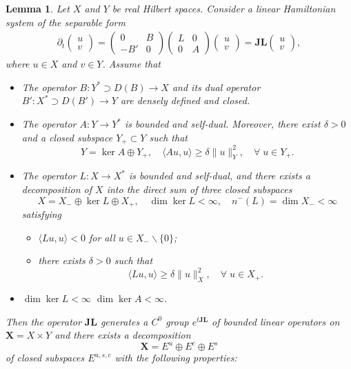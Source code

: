 \documentclass[1 [leqno, 11pt]{amsart}
\numberwithin{equation}{section}
\newtheorem{lemma}[Theorem]{Lemma}
\begin{document}
\begin{CJK*}{GBK}{song}
\begin{lemma}  \label{indice-theorem-sep}
Let $X$ and $Y$ be real Hilbert spaces. Consider a linear Hamiltonian system of the separable form
\begin{align}\label{sep-hamil}
\partial_t \left( \begin{array}{c} u \\ v \end{array} \right) = \left( \begin{array}{cc} 0 & B \\ -B' & 0 \end{array} \right)\left( \begin{array}{cc} L & 0 \\ 0 & A \end{array} \right) \left( \begin{array}{c} u \\ v \end{array} \right) = \mathbf{J}  \mathbf{L} \left( \begin{array}{c} u \\ v \end{array} \right),
\end{align}
where $u \in X$ and $v \in Y$.
Assume that
\begin{itemize}
\item[{\textbf{(G1)}}] The operator $B: Y^* \supset D(B) \rightarrow X$ and its dual operator $B': X^* \supset D(B') \rightarrow Y$ are densely defined and closed.
\item[{\textbf{(G2)}}] The operator $A: Y \rightarrow Y^*$ is bounded and self-dual. Moreover, there exist $\delta > 0$  and a closed subspace $Y_+ \subset Y$ such that
$$ Y = \ker A \oplus Y_+,  \quad \langle Au, u \rangle \geq \delta \|u\|_Y^2,\quad \forall\; u \in Y_+.$$
\item[{\textbf{(G3)}}] The operator $L: X \rightarrow X^*$ is bounded and self-dual, and there exists a decomposition of $X$ into the direct sum of three closed subspaces
$$X = X_- \oplus \ker L \oplus X_+, \quad \dim \ker L < \infty,  \quad n^-(L) = \dim X_- < \infty$$
satisfying
\begin{itemize}
\item[{\textbf{(G3.a)}}]
$\langle Lu, u \rangle < 0$ for all $u\in X_- \backslash \{0\}$;
\item[{\textbf{(G3.b)}}] there exists $\delta > 0$ such that
$$\langle Lu, u \rangle \geq \delta \|u\|_X^2, \quad\forall \; u \in X_+.$$
\end{itemize}
\item[{\textbf{(G4)}}] $\dim \ker L < \infty$  $\dim \ker A < \infty$.
\end{itemize}
Then the operator $\mathbf{JL}$ generates a $C^0$ group $e^{t\mathbf{JL}}$ of bounded linear operators on $\mathbf{X} = X \times Y$ and there exists a decomposition
$$\mathbf{X} = E^u \oplus E^c \oplus E^s$$
of closed subspaces $E^{u,s,c}$ with the following properties:


\end{lemma}
\end{CJK*}
\end{document}
